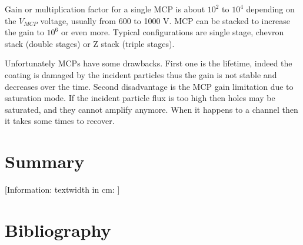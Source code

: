 \begin{refsection}
	

  Gain or multiplication factor for a single MCP is about $10^{2}$ to $10^{4}$ depending on the $V_{MCP}$ voltage, usually from 600 to 1000 V. MCP can be stacked to increase the gain to $10^{6}$ or even more. Typical configurations are single stage, chevron stack (double stages) or Z stack (triple stages).

  Unfortunately MCPs have some drawbacks. First one is the lifetime, indeed the coating is damaged by the incident particles thus the gain is not stable and decreases over the time. Second disadvantage is the MCP gain limitation due to saturation mode. If the incident particle flux is too high then holes may be saturated, and they cannot amplify anymore. When it happens to a channel then it takes some times to recover.

  \section{Summary}
  \label{ch3:Summary}
  [Information: textwidth in cm: \prntlen{\textwidth}]

  
  
  
  

  \cleardoublepage
  \section*{Bibliography}
  \label{ch3:bib}
  \printbibliography[heading=subbibliography]

\end{refsection}